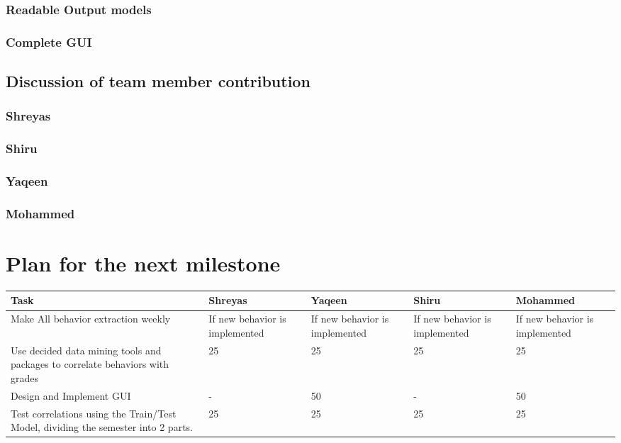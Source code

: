 \documentclass[12pt]{article}
\begin{document}
	
	\subsubsection{Readable Output models}

	\subsubsection{Complete GUI}

	\subsection{Discussion of team member contribution}
	\subsubsection{Shreyas}
	

	\subsubsection{Shiru}
	
	\subsubsection{Yaqeen}
	
	\subsubsection{Mohammed}
	
	
	\section{Plan for the next milestone}
	\begin{tabularx}{\linewidth}{|X|X|X|X|X|}
	\hline	\textbf{Task} & \textbf{Shreyas} & \textbf{Yaqeen} & \textbf{Shiru} & \textbf{Mohammed} \\ \hline
	Make All behavior extraction weekly & If new behavior is implemented & If new behavior is implemented & If new behavior is implemented & If new behavior is implemented \\ \hline
	Use decided data mining tools and packages to correlate behaviors with grades & 25 & 25 & 25 & 25 \\ \hline
	Design and Implement GUI & - & 50 & - & 50 \\ \hline
	Test correlations using the Train/Test Model, dividing the semester into 2 parts. & 25 & 25&25&25\\ \hline
	\end{tabularx}
\end{document}
